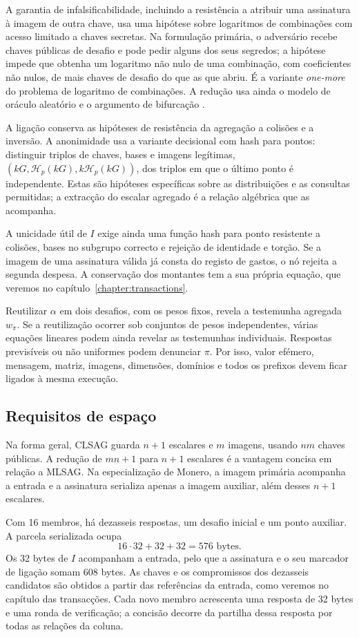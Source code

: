 A garantia de infalsificabilidade, incluindo a resistência a atribuir
uma assinatura à imagem de outra chave, usa uma hipótese sobre
logaritmos de combinações com acesso limitado a chaves secretas.
Na formulação primária, o adversário recebe chaves públicas de desafio
e pode pedir alguns dos seus segredos; a hipótese impede que obtenha
um logaritmo não nulo de uma combinação, com coeficientes não nulos, de mais chaves
de desafio do que as que abriu. É a variante \emph{one-more} do problema de
logaritmo de combinações. A redução usa ainda o modelo de oráculo
aleatório e o argumento de bifurcação \cite{MRL-0011-CLSAG}.

A ligação conserva as hipóteses de resistência da agregação a colisões
e a inversão. A anonimidade usa a variante decisional com hash para
pontos: distinguir triplos de chaves, bases e imagens legítimas,
\((kG,\mathcal H_p(kG),k\mathcal H_p(kG))\), dos triplos em que o
último ponto é independente. Estas são hipóteses específicas sobre
as distribuições e as consultas permitidas; a extracção do escalar
agregado é a relação algébrica que as acompanha.

A unicidade útil de \(I\) exige ainda uma função hash para ponto resistente a
colisões, bases no subgrupo correcto e rejeição de identidade e torção.
Se a imagem de uma assinatura válida já consta do registo de gastos,
o nó rejeita a segunda despesa. A conservação dos montantes tem a sua
própria equação, que veremos no capítulo~\ref{chapter:transactions}.

Reutilizar \(\alpha\) em dois desafios, com os pesos fixos, revela a
testemunha agregada
\(w_\pi\). Se a reutilização ocorrer sob conjuntos de pesos independentes,
várias equações lineares podem ainda revelar as testemunhas individuais.
Respostas previsíveis ou não uniformes podem denunciar \(\pi\). Por isso,
valor efémero, mensagem, matriz, imagens, dimensões, domínios e todos os prefixos
devem ficar ligados à mesma execução.

\subsection*{Requisitos de espaço}

Na forma geral, CLSAG guarda \(n+1\) escalares e \(m\) imagens, usando
\(nm\) chaves públicas. A redução de \(mn+1\) para \(n+1\) escalares é a
vantagem concisa em relação a MLSAG. Na especialização de Monero, a imagem
primária acompanha a entrada e a assinatura serializa apenas a imagem
auxiliar, além desses \(n+1\) escalares.

Com 16 membros, há dezasseis respostas, um desafio inicial e um ponto
auxiliar. A parcela serializada ocupa
\[
 16\cdot32+32+32=576\text{ bytes}.
\]
Os 32 bytes de \(I\) acompanham a entrada, pelo que a assinatura e o seu
marcador de ligação somam \(608\) bytes. As chaves e os compromissos dos
dezasseis candidatos são obtidos a partir das referências da entrada,
como veremos no capítulo das transacções. Cada novo membro acrescenta
uma resposta de 32 bytes e uma ronda de verificação; a concisão decorre
da partilha dessa resposta por todas as relações da coluna.
